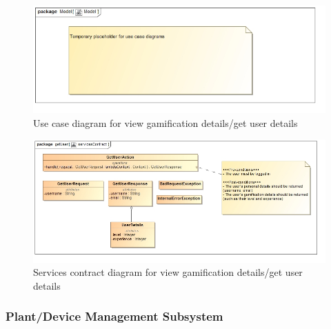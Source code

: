 \documentclass{article}
\begin{document}
		\begin{figure}[H]
			\includegraphics[width=\linewidth]{images/tempUseCase.jpg}
			\caption{Use case diagram for view gamification details/get user details}
		\end{figure}
		
		\begin{figure}[H]
			\includegraphics[width=\linewidth]{images/ServicesContracts/getUser.jpg}
			\caption{Services contract diagram for view gamification details/get user details}
		\end{figure}

\subsubsection{Plant/Device Management Subsystem}
\end{document}
